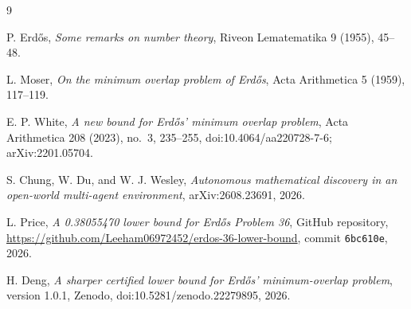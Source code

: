 \documentclass[11pt]{article}
\begin{document}
\begin{thebibliography}{9}

P. Erd\H{o}s,
\emph{Some remarks on number theory},
Riveon Lematematika 9 (1955), 45--48.

L. Moser,
\emph{On the minimum overlap problem of Erd\H{o}s},
Acta Arithmetica 5 (1959), 117--119.

E. P. White,
\emph{A new bound for Erd\H{o}s' minimum overlap problem},
Acta Arithmetica 208 (2023), no.~3, 235--255,
doi:10.4064/aa220728-7-6; arXiv:2201.05704.

S. Chung, W. Du, and W. J. Wesley,
\emph{Autonomous mathematical discovery in an open-world multi-agent
environment},
arXiv:2608.23691, 2026.

L. Price,
\emph{A 0.38055470 lower bound for Erd\H{o}s Problem 36},
GitHub repository,
\url{https://github.com/Leeham06972452/erdos-36-lower-bound},
commit \texttt{6bc610e}, 2026.

H. Deng,
\emph{A sharper certified lower bound for Erd\H{o}s' minimum-overlap problem},
version 1.0.1, Zenodo, doi:10.5281/zenodo.22279895, 2026.

\end{thebibliography}
\end{document}
